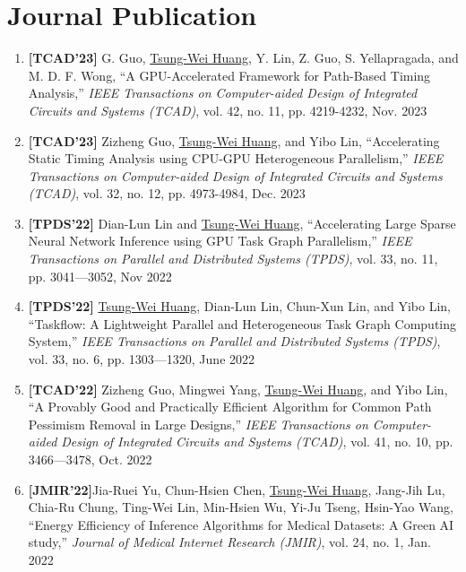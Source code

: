 \documentclass[A4,11pt]{article}
\begin{document}
\section{Journal Publication}
 \begin{enumerate}
 \itemsep-3pt
  \item \textbf{[TCAD'23]} G. Guo, \underline{Tsung-Wei Huang}, Y. Lin, Z. Guo, S. Yellapragada, and M. D. F. Wong, ``A GPU-Accelerated Framework for Path-Based Timing Analysis,'' \textit{IEEE Transactions on Computer-aided Design of Integrated Circuits and Systems (TCAD)}, vol. 42, no. 11, pp. 4219-4232, Nov. 2023

  \item \textbf{[TCAD'23]} Zizheng Guo, \underline{Tsung-Wei Huang}, and Yibo Lin, ``Accelerating Static Timing Analysis using CPU-GPU Heterogeneous Parallelism,'' \textit{IEEE Transactions on Computer-aided Design of Integrated Circuits and Systems (TCAD)}, vol. 32, no. 12, pp. 4973-4984, Dec. 2023

  \item \textbf{[TPDS'22]} Dian-Lun Lin and \underline{Tsung-Wei Huang}, ``Accelerating Large Sparse Neural Network Inference using GPU Task Graph Parallelism,'' \textit{IEEE Transactions on Parallel and Distributed Systems (TPDS)}, vol. 33, no. 11, pp. 3041—3052, Nov 2022

  \item \textbf{[TPDS'22]} \underline{Tsung-Wei Huang}, Dian-Lun Lin, Chun-Xun Lin, and Yibo Lin, ``Taskflow: A Lightweight Parallel and Heterogeneous Task Graph Computing System,'' \textit{IEEE Transactions on Parallel and Distributed Systems (TPDS)}, vol. 33, no. 6, pp. 1303—1320, June 2022

  \item \textbf{[TCAD'22]} Zizheng Guo, Mingwei Yang, \underline{Tsung-Wei Huang}, and Yibo Lin, ``A Provably Good and Practically Efficient Algorithm for Common Path Pessimism Removal in Large Designs,'' \textit{IEEE Transactions on Computer-aided Design of Integrated Circuits and Systems (TCAD)}, vol. 41, no. 10, pp. 3466—3478, Oct. 2022

  \item \textbf{[JMIR'22]}Jia-Ruei Yu, Chun-Hsien Chen, \underline{Tsung-Wei Huang}, Jang-Jih Lu, Chia-Ru Chung, Ting-Wei Lin, Min-Hsien Wu, Yi-Ju Tseng, Hsin-Yao Wang, ``Energy Efficiency of Inference Algorithms for Medical Datasets: A Green AI study,'' \textit{Journal of Medical Internet Research (JMIR)}, vol. 24, no. 1, Jan. 2022


\end{enumerate}
\end{document}
